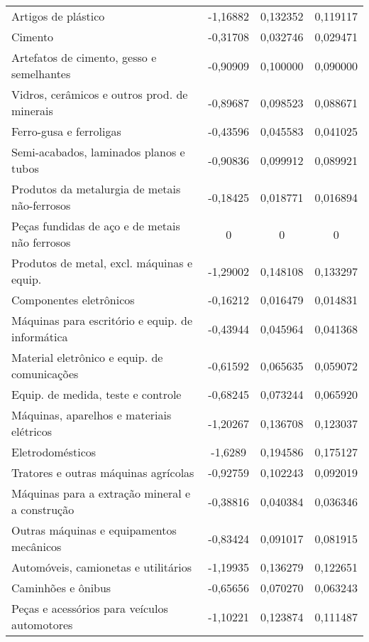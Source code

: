 \begin{apendicesenv}
\begin{small}
\begin{center}
\begin{longtable}{m{8cm}ccc}
				Artigos de plástico                                & -1,16882 & 0,132352 & 0,119117 \\
				Cimento                                            & -0,31708 & 0,032746 & 0,029471 \\
				Artefatos de cimento, gesso e semelhantes          & -0,90909 & 0,100000 & 0,090000 \\
				Vidros, cerâmicos e outros prod. de minerais       & -0,89687 & 0,098523 & 0,088671 \\
				Ferro-gusa e ferroligas                            & -0,43596 & 0,045583 & 0,041025 \\
				Semi-acabados, laminados planos e tubos            & -0,90836 & 0,099912 & 0,089921 \\
				Produtos da metalurgia de metais não-ferrosos      & -0,18425 & 0,018771 & 0,016894 \\
				Peças fundidas de aço e de metais não ferrosos     & 0 & 0 & 0 \\
				Produtos de metal, excl. máquinas e equip.         & -1,29002 & 0,148108 & 0,133297 \\
				Componentes eletrônicos                            & -0,16212 & 0,016479 & 0,014831 \\
				Máquinas para escritório e equip. de informática   & -0,43944 & 0,045964 & 0,041368 \\
				Material eletrônico e equip. de comunicações       & -0,61592 & 0,065635 & 0,059072 \\
				Equip. de medida, teste e controle                 & -0,68245 & 0,073244 & 0,065920 \\
				Máquinas, aparelhos e materiais elétricos          & -1,20267 & 0,136708 & 0,123037 \\
				Eletrodomésticos                                   & -1,6289 & 0,194586 & 0,175127 \\
				Tratores e outras máquinas agrícolas               & -0,92759 & 0,102243 & 0,092019 \\
				Máquinas para a extração mineral e a construção    & -0,38816 & 0,040384 & 0,036346 \\
				Outras máquinas e equipamentos mecânicos           & -0,83424 & 0,091017 & 0,081915 \\
				Automóveis, camionetas e utilitários               & -1,19935 & 0,136279 & 0,122651 \\
				Caminhões e ônibus                                 & -0,65656 & 0,070270 & 0,063243 \\
				Peças e acessórios para veículos automotores       & -1,10221 & 0,123874 & 0,111487 \\

\end{longtable}
\end{center}
\end{small}
\end{apendicesenv}
